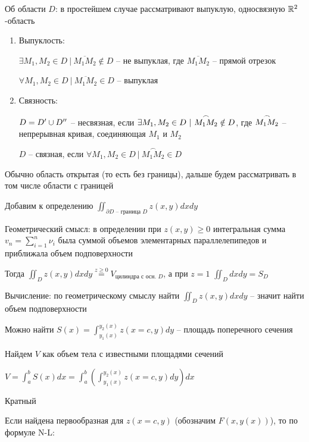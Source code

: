 \documentclass[12pt]{article}
\begin{document}
    \Nota Об области $D$: в простейшем случае рассматривают выпуклую, односвязную $\mathbb{R}^2$-область

    \begin{enumerate}
        \item[а) ] Выпуклость:

        $\exists M_1, M_2 \in D \ | \ \overline{M_1 M_2} \notin D$ -- не выпуклая, где $\overline{M_1 M_2}$ -- прямой отрезок

        $\forall M_1, M_2 \in D \ | \ \overline{M_1 M_2} \in D$ -- выпуклая

        \item[б) ] Связность:

        $D = D^\prime \cup D^{\prime\prime}$ -- несвязная, если $\exists M_1, M_2 \in D \ | \ \overset{\Huge \frown}{M_1 M_2} \notin D$, где $\overset{\Huge \frown}{M_1 M_2}$ -- непрерывная кривая, соединяющая $M_1$ и $M_2$ 

        $D$ -- связная, если $\forall M_1, M_2 \in D \ | \ \overset{\frown}{M_1 M_2} \in D$
    \end{enumerate}

    Обычно область открытая (то есть без границы), дальше будем рассматривать в том числе области с границей

    Добавим к определению $\iint_{\partial D \text{ -- граница } D} z(x, y) dx dy$

    Геометрический смысл: в определении при $z(x, y) \geq 0$ интегральная сумма $v_n = \sum_{i=1}^n \nu_i$ была суммой объемов элементарных параллелепипедов и приближала объем подповерхности

    Тогда $\iint_D z(x, y) dx dy \stackrel{z \geq 0}{=} V_{\text{цилиндра с осн. } D}$, а при $z = 1$ $\iint_D dx dy = S_D$

    \hypertarget{doubleintegralcalculation}{}

    Вычисление: по геометрическому смыслу найти $\iint_D z(x, y) dx dy$ -- значит найти объем подповерхности

    Можно найти $S(x) = \int^{y_2(x)}_{y_1(x)} z(x = c, y) dy$ -- площадь поперечного сечения

    Найдем $V$ как объем тела с известными площадями сечений

    $V = \int^b_a S(x) dx = \int_a^b \left(\int^{y_2(x)}_{y_1(x)} z(x = c, y) dy\right) dx$

    \hypertarget{multipleintegral}{}

    \Nota Кратный

    Если найдена первообразная для $z(x = c, y)$ (обозначим $F(x, y(x))$), то по формуле N-L:
\end{document}
